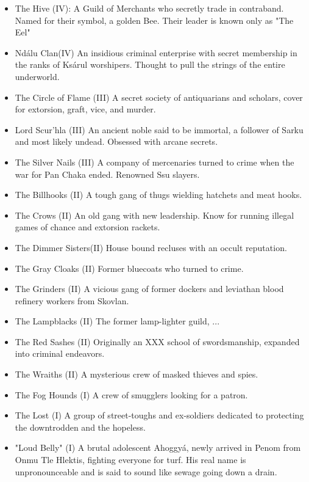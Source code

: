 \begin{itemize}

\item The Hive (IV): A Guild of Merchants who secretly trade in contraband. Named for their symbol, a golden Bee. Their leader is known only as "The Eel"
\item Ndálu Clan(IV) An insidious criminal enterprise with secret membership in the ranks of Ksárul worshipers. Thought to pull the strings of the entire underworld. 
\item The Circle of Flame (III) A secret society of antiquarians and scholars, cover for extorsion, graft, vice, and murder.
\item Lord Scur'hla (III) An ancient noble said to be immortal, a follower of Sarku and most likely undead. Obsessed with arcane secrets.
\item The Silver Nails (III) A company of mercenaries turned to crime when the war for Pan Chaka ended. Renowned Ssu slayers. 
\item The Billhooks (II) A tough gang of thugs wielding hatchets and meat hooks.
\item The Crows (II) An old gang with new leadership. Know for running illegal games of chance and extorsion rackets. 
\item The Dimmer Sisters(II) House bound recluses with an occult reputation.
\item The Gray Cloaks (II) Former bluecoats who turned to crime.
\item The Grinders (II) A vicious gang of former dockers and leviathan blood refinery workers from Skovlan.
\item The Lampblacks (II) The former lamp-lighter guild, ...
\item The Red Sashes (II) Originally an XXX school of swordsmanship, expanded into criminal endeavors.
\item The Wraiths (II) A mysterious crew of masked thieves and spies.
\item The Fog Hounds (I) A crew of smugglers looking for a patron.
\item The Lost (I) A group of street-toughs and ex-soldiers dedicated to protecting the downtrodden and the hopeless.
\item "Loud Belly" (I) A brutal adolescent Ahoggyá, newly arrived in Penom from Onmu Tle Hlektis, fighting everyone for turf. His real name is unpronounceable and is said to sound like sewage going down a drain.

\end{itemize}

